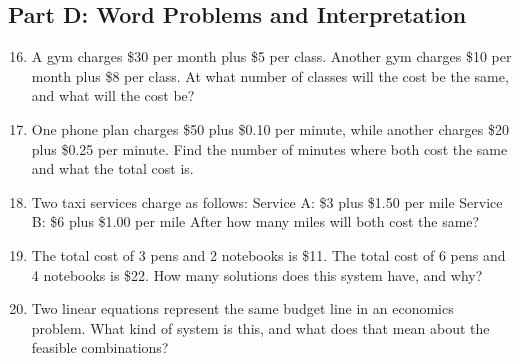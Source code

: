 \documentclass[12pt]{article}
\begin{document}
\subsection*{Part D: Word Problems and Interpretation}
\begin{enumerate}
    \setcounter{enumi}{15}
    \item A gym charges \$30 per month plus \$5 per class. Another gym charges \$10 per month plus \$8 per class. At what number of classes will the cost be the same, and what will the cost be?
    \item One phone plan charges \$50 plus \$0.10 per minute, while another charges \$20 plus \$0.25 per minute. Find the number of minutes where both cost the same and what the total cost is.
    \item Two taxi services charge as follows:  
    Service A: \$3 plus \$1.50 per mile  
    Service B: \$6 plus \$1.00 per mile  
    After how many miles will both cost the same?
    \item The total cost of 3 pens and 2 notebooks is \$11. The total cost of 6 pens and 4 notebooks is \$22. How many solutions does this system have, and why?
    \item Two linear equations represent the same budget line in an economics problem. What kind of system is this, and what does that mean about the feasible combinations?
\end{enumerate}
\end{document}
